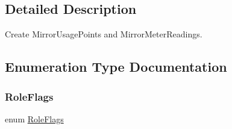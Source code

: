 \subsection{Detailed Description}
Create Mirror\+Usage\+Points and Mirror\+Meter\+Readings. 

\subsection{Enumeration Type Documentation}
\mbox{\label{group__metering_gab0fd19d6dbdfff825c669e43fc4f2cbe}} 
\subsubsection{\texorpdfstring{Role\+Flags}{RoleFlags}}
{\footnotesize\ttfamily enum \hyperlink{group__metering_gab0fd19d6dbdfff825c669e43fc4f2cbe}{Role\+Flags}}

